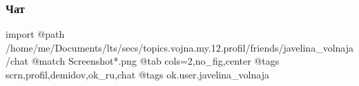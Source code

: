  
 
 
 
 

\subsubsection{Чат}

\ifcmt
 import
 @path /home/me/Documents/lts/secs/topics.vojna.my.12.profil/friends/javelina_volnaja/chat
 @match Screenshot*.png
 @tab cols=2,no_fig,center
 @tags scrn,profil,demidov,ok_ru,chat
 @tags ok.user.javelina_volnaja
\fi
